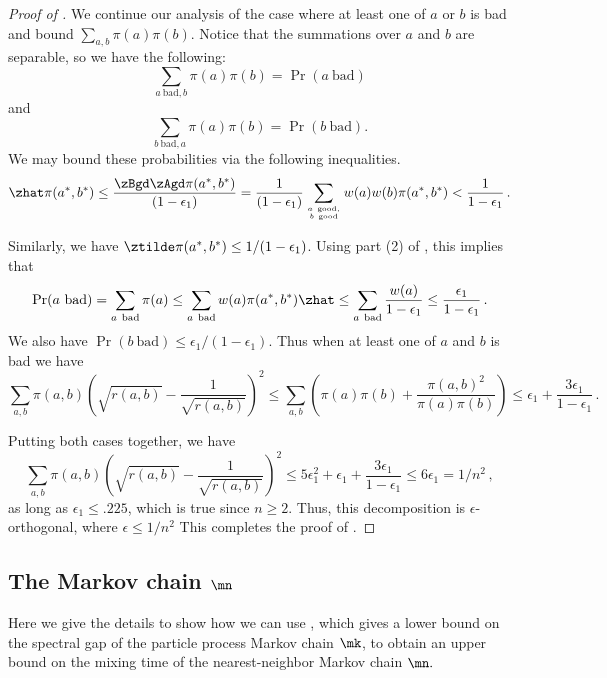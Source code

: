 \documentclass{toc}
\begin{document}
\begin{proof}[Proof of ]
We continue our analysis of the case where at least one of $a$ or $b$ is bad and bound $\sum_{a,b}\pi(a)\pi(b).$ 
Notice that the summations over $a$ and $b$ are separable, so we have 
the following:
\begin{equation*}
  \sum_{a~\text{bad}, b} \pi(a)\pi(b) = \Pr(a~\text{bad})
\end{equation*}
and
\begin{equation*}
  \sum_{b~\text{bad}, a} \pi(a)\pi(b) = \Pr(b~\text{bad}).
\end{equation*}
We may bound these probabilities via the following inequalities.
 $$\zhat\pi(a^*,b^*) \leq
  \frac{\zBgd\zAgd\pi(a^*,b^*)}{(1-\epsilon_1)}=\frac{1}{(1-\epsilon_1)}\sum_{a~\text{good},\atop
    b~\text{good}} w(a)w(b) \pi(a^*,b^*)  <
  \frac{1}{1-\epsilon_1}\,.$$
  
\noindent Similarly, we have $\ztilde\pi(a^*,b^*)\leq 
1/(1-\epsilon_1)$.  Using part (2) of , this 
implies that
  \[\Pr(a~\text{bad}) = \sum_{a~\text{bad}}\pi(a) \leq
  \sum_{a~\text{bad}}w(a)\pi(a^*,b^*)\zhat\leq
  \sum_{a~\text{bad}}\frac{w(a)}{1-\epsilon_1}\leq
  \frac{\epsilon_1}{1-\epsilon_1} \,.\]
  We also have $\Pr(b~\text{bad}) \leq \epsilon_1/(1-\epsilon_1)$.
Thus when at least one of $a$ and $b$ is bad we have $$\sum_{a,b}\pi(a,b)\left(\sqrt{r(a,b)}-\frac{1}{\sqrt{r(a,b)}}\right)^2\leq
\sum_{a,b} \left(\pi(a)\pi(b) + \frac{\pi(a,b)^2}{\pi(a)\pi(b)}\right) \leq \epsilon_1 + \frac{3\epsilon_1}{1-\epsilon_1}\,.$$

Putting both cases together, we have
 \[\sum_{a, b}\pi(a,b)\left(\sqrt{r(a,b)}-\frac{1}{\sqrt{r(a,b)}}\right)^2\leq
  5\epsilon_1^2 + \epsilon_1 + \frac{3\epsilon_1}{1-\epsilon_1} \leq
  6\epsilon_1 = 1/n^2\,,\]
  as long as $\epsilon_1\leq .225$, which is true since $n\geq 2$.
Thus, this decomposition is %
$\epsilon$-orthogonal, where $\epsilon\leq 1/n^2$ %
This completes the proof of . %
%
%
%
\end{proof}   %

\subsection{The Markov chain $\mn$}\label{sec:mn}

Here we give the details to show how we can use , 
which gives a  %
lower  %
bound on the spectral gap of the particle process Markov 
chain $\mk$, to obtain %
an upper  %
bound on the mixing time of the 
nearest-neighbor Markov chain $\mn.$  
\end{document}
